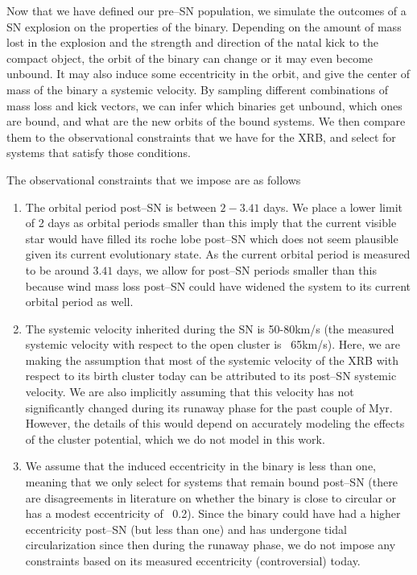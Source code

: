 \documentclass[linenumbers,trackchanges,twocolumn]{aastex701}
\begin{document}
Now that we have defined our pre--SN population, we simulate the outcomes of a SN explosion on the properties of the binary. Depending on the amount of mass lost in the explosion and the strength and direction of the natal kick to the compact object, the orbit of the binary can change or it may even become unbound. It may also induce some eccentricity in the orbit, and give the center of mass of the binary a systemic velocity. By sampling different combinations of mass loss and kick vectors, we can infer which binaries get unbound, which ones are bound, and what are the new orbits of the bound systems. We then compare them to the observational constraints that we have for the XRB, and select for systems that satisfy those conditions.

The observational constraints that we impose are as follows 

\begin{enumerate}
        \item The orbital period post--SN is between $2-3.41$ days. We place a lower limit of 2 days as orbital periods smaller than this imply that the current visible star would have filled its roche lobe post--SN which does not seem plausible given its current evolutionary state. As the current orbital period is measured to be around $3.41$ days, we allow for post--SN periods smaller than this because wind mass loss post--SN could have widened the system to its current orbital period as well.
        \item The systemic velocity inherited during the SN is 50-80km/s (the measured systemic velocity with respect to the open cluster is ~65km/s). Here, we are making the assumption that most of the systemic velocity of the XRB with respect to its birth cluster today can be attributed to its post--SN systemic velocity. We are also implicitly assuming that this velocity has not significantly changed during its runaway phase for the past couple of Myr. However, the details of this would depend on accurately modeling the effects of the cluster potential, which we do not model in this work.
        \item We assume that the induced eccentricity in the binary is less than one, meaning that we only select for systems that remain bound post--SN (there are disagreements in literature on whether the binary is close to circular or has a modest eccentricity of ~0.2). Since the binary could have had a higher eccentricity post--SN (but less than one) and has undergone tidal circularization since then during the runaway phase, we do not impose any constraints based on its measured eccentricity (controversial) today.
\end{enumerate}
\end{document}
